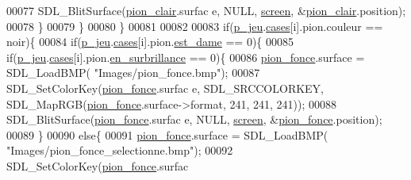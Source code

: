 \begin{DoxyCode}
00077                                                 SDL\_BlitSurface(\hyperlink{fonction_interface_8h_ae7267ac64141d082948941a1b51d4df6}{pion_clair}.surfac
      e, NULL, \hyperlink{fonction_interface_8h_a78fa3957d73de49cb81d047857504218}{screen}, &\hyperlink{fonction_interface_8h_ae7267ac64141d082948941a1b51d4df6}{pion_clair}.position);
00078                                         \}
00079                                 \}
00080                         \}
00081 
00082 
00083                         \textcolor{keywordflow}{if}(\hyperlink{moteur_8h_a3efa8d0f7c65daedc584dc8db048e62c}{p_jeu}.\hyperlink{structplateau_a6afaa60f594542e0d742b0c6d3223392}{cases}[i].pion.couleur == noir)\{
00084                                 \textcolor{keywordflow}{if}(\hyperlink{moteur_8h_a3efa8d0f7c65daedc584dc8db048e62c}{p_jeu}.\hyperlink{structplateau_a6afaa60f594542e0d742b0c6d3223392}{cases}[i].pion.\hyperlink{structpion_a13d497ed763d6eba18df86caf4c85861}{est_dame} == 0)\{
00085                                         \textcolor{keywordflow}{if}(\hyperlink{moteur_8h_a3efa8d0f7c65daedc584dc8db048e62c}{p_jeu}.\hyperlink{structplateau_a6afaa60f594542e0d742b0c6d3223392}{cases}[i].pion.\hyperlink{structpion_ae49bb71ca6836b02fd9efa3c1fa64405}{en_surbrillance} ==
       0)\{
00086                                                 \hyperlink{fonction_interface_8h_a91d0d5668d6c4d2c6cd5bbeab0f9ca15}{pion_fonce}.surface = SDL\_LoadBMP(
      \textcolor{stringliteral}{"Images/pion\_fonce.bmp"});
00087                                                 SDL\_SetColorKey(\hyperlink{fonction_interface_8h_a91d0d5668d6c4d2c6cd5bbeab0f9ca15}{pion_fonce}.surfac
      e, SDL\_SRCCOLORKEY, SDL\_MapRGB(\hyperlink{fonction_interface_8h_a91d0d5668d6c4d2c6cd5bbeab0f9ca15}{pion_fonce}.surface->format, 241, 241, 241));
00088                                                 SDL\_BlitSurface(\hyperlink{fonction_interface_8h_a91d0d5668d6c4d2c6cd5bbeab0f9ca15}{pion_fonce}.surfac
      e, NULL, \hyperlink{fonction_interface_8h_a78fa3957d73de49cb81d047857504218}{screen}, &\hyperlink{fonction_interface_8h_a91d0d5668d6c4d2c6cd5bbeab0f9ca15}{pion_fonce}.position);
00089                                         \}
00090                                         \textcolor{keywordflow}{else}\{
00091                                                 \hyperlink{fonction_interface_8h_a91d0d5668d6c4d2c6cd5bbeab0f9ca15}{pion_fonce}.surface = SDL\_LoadBMP(
      \textcolor{stringliteral}{"Images/pion\_fonce\_selectionne.bmp"});
00092                                                 SDL\_SetColorKey(\hyperlink{fonction_interface_8h_a91d0d5668d6c4d2c6cd5bbeab0f9ca15}{pion_fonce}.surfac

\end{DoxyCode}
